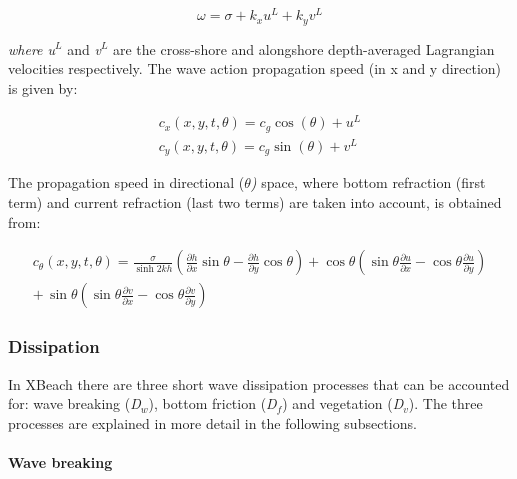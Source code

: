 \documentclass{article}
\begin{document}
\noindent  
\begin{equation} \label{2.8)} 
\omega =\sigma +k_{x} u^{L} +k_{y} v^{L}  
\end{equation} 


\noindent \textit{where u${}^{L}$} and \textit{v${}^{L}$} are the cross-shore and alongshore depth-averaged Lagrangian velocities respectively. The wave action propagation speed (in x and y direction) is given by:

\noindent 
\begin{equation} \label{2.9)} 
\begin{array}{l} {c_{x} (x,y,t,\theta )=c_{g} \cos (\theta )+u^{L} } \\ {c_{y} (x,y,t,\theta )=c_{g} \sin (\theta )+v^{L} } \end{array} 
\end{equation} 


\noindent The propagation speed in directional (\textit{$\theta $)} space, where bottom refraction (first term) and current refraction (last two terms) are taken into account, is obtained from:

\noindent 
\begin{equation} \label{2.10)} 
\begin{array}{r} {c_{\theta } (x,y,t,\theta )=\frac{\sigma }{\sinh 2kh} \left(\frac{\partial h}{\partial x} \sin \theta -\frac{\partial h}{\partial y} \cos \theta \right)+\cos \theta \left(\sin \theta \frac{\partial u}{\partial x} -\cos \theta \frac{\partial u}{\partial y} \right)} \\ {+\, \sin \theta \left(\sin \theta \frac{\partial v}{\partial x} -\cos \theta \frac{\partial v}{\partial y} \right)} \end{array} 
\end{equation} 


\subsubsection{ Dissipation}

\noindent In XBeach there are three short wave dissipation processes that can be accounted for: wave breaking (\textit{D${}_{w}$}), bottom friction (\textit{D${}_{f}$}) and vegetation (\textit{D${}_{v}$}). The three processes are explained in more detail in the following subsections.


\paragraph{ Wave breaking}
\end{document}
